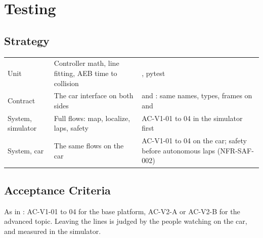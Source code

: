 \documentclass[11pt,a4paper]{article}
\begin{document}
\section{Testing}
\subsection{Strategy}
\begin{tabularx}{\textwidth}{@{}L{3cm} L{4cm} Y@{}}
\toprule
{} &  &  \\
\midrule
Unit & Controller math, line fitting, AEB time to collision & , pytest \\
Contract & The car interface on both sides &  and : same names, types, frames on  and  \\
System, simulator & Full flows: map, localize, laps, safety & AC-V1-01 to 04 in the simulator first \\
System, car & The same flows on the car & AC-V1-01 to 04 on the car; safety before autonomous laps (NFR-SAF-002) \\
\bottomrule
\end{tabularx}

\subsection{Acceptance Criteria}
As in : AC-V1-01 to 04 for the base platform, AC-V2-A or AC-V2-B for the advanced topic. Leaving the lines is judged by the people watching on the car, and measured in the simulator.

\end{document}
